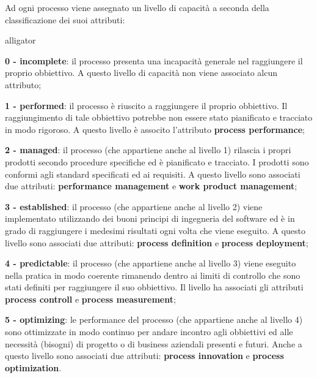 Ad ogni processo viene assegnato un livello di capacità a seconda della classificazione dei suoi attributi:
\begin{labeling}{alligator}
	\item \textbf{0 - incomplete}: il processo presenta una incapacità generale nel raggiungere il proprio obbiettivo. A questo livello di capacità non viene associato alcun attributo;
	
	\item \textbf{1 - performed}: il processo è riuscito a raggiungere il proprio obbiettivo. Il raggiungimento di tale obbiettivo potrebbe non essere stato pianificato e tracciato in modo rigoroso. A questo livello è associto l'attributo \textbf{process performance};
	
	\item \textbf{2 - managed}: il processo (che appartiene anche al livello 1) rilascia i propri prodotti secondo procedure specifiche ed è pianificato e tracciato. I prodotti sono conformi agli standard specificati ed ai requisiti. A questo livello sono associati due attributi: \textbf{performance management} e \textbf{work product management};
	
	\item \textbf{3 - established}: il processo (che appartiene anche al livello 2) viene implementato utilizzando dei buoni principi di ingegneria del software ed è in grado di raggiungere i medesimi risultati ogni volta che viene eseguito. A questo livello sono associati due attributi: \textbf{process definition} e \textbf{process deployment};
	
	\item \textbf{4 - predictable}: il processo (che appartiene anche al livello 3) viene eseguito nella pratica in modo coerente rimanendo dentro ai limiti di controllo che sono stati definiti per raggiungere il suo obbiettivo. Il livello ha associati gli attributi \textbf{process controll} e \textbf{process measurement};
	
	\item \textbf{5 - optimizing}: le performance del processo (che appartiene anche al livello 4) sono ottimizzate in modo continuo per andare incontro agli obbiettivi ed alle necessità (bisogni) di progetto o di business aziendali presenti e futuri. %
	Anche a questo livello sono associati due attributi: \textbf{process innovation} e \textbf{process optimization}.
\end{labeling}

